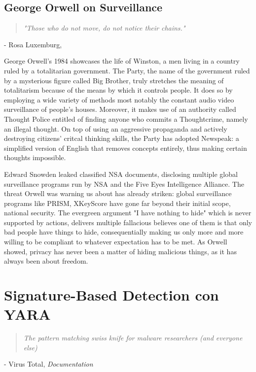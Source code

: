 \documentclass[12pt,oneside]{fithesis2}
\newcommand{\chapquote}[3]{\begin{quotation} \textit{#1} \end{quotation} \begin{flushright} - #2, \textit{#3}\end{flushright} }
\begin{document}
        \section*{George Orwell on Surveillance}
        \chapquote{"Those who do not move, do not notice their chains."}{Rosa Luxemburg}{}
        George Orwell's 1984  showcases the life of Winston, a men living in a country ruled by a totalitarian government. The Party, the name of the government ruled by a mysterious figure called Big Brother, truly stretches the meaning of totalitarism because of the means by which it controls people. It does so by employing a wide variety of methods most notably the constant audio video surveillance of people's houses. Moreover, it makes use of an authority called Thought Police entitled of finding anyone who commits a Thoughtcrime, namely an illegal thought. On top of using an aggressive propaganda and actively destroying citizens' critcal thinking skills, the Party has adopted Newspeak: a simplified version of English that removes concepts entirely, thus making certain thoughts impossible.\par Edward Snowden leaked classified NSA documents, disclosing multiple global surveillance programs run by NSA and the Five Eyes Intelligence Alliance. The threat Orwell was warning us about has already striken: global surveillance programs like PRISM, XKeyScore have gone far beyond their initial scope, national security. The evergreen argument "I have nothing to hide" which is never supported by actions, delivers multiple fallacious believes one of them is that only bad people have things to hide, consequentially making us only more and more willing to be compliant to whatever expectation has to be met. As Orwell showed, privacy has never been a matter of hiding malicious things, as it has always been about freedom. 
        
        \chapter*{Signature-Based Detection con YARA}
        \begin{center}
        \end{center}
        \chapquote{ The pattern matching swiss knife for malware researchers (and everyone else)}{Virus Total}{Documentation}
        
\end{document}
